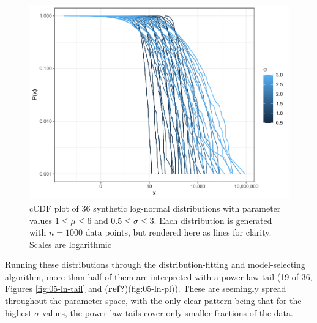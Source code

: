 \documentclass[
  12pt,
  a4paper, twoside]{book}
\begin{document}
\begin{figure}

{\centering \includegraphics[width=0.9\linewidth]{bookdown-demo_files/figure-latex/05-synth-ln-1} 

}

\caption[Log-normal distributions and parameter values]{cCDF plot of 36 synthetic log-normal distributions with parameter values \(1 \leq \mu \leq 6\) and \(0.5 \leq \sigma \leq 3\). Each distribution is generated with \(n = 1000\) data points, but rendered here as lines for clarity. Scales are logarithmic}\label{fig:05-synth-ln}
\end{figure}

Running these distributions through the distribution-fitting and model-selecting algorithm, more than half of them are interpreted with a power-law tail (19 of 36, Figures \ref{fig:05-ln-tail} and (\textbf{ref?})(fig:05-ln-pl)). These are seemingly spread throughout the parameter space, with the only clear pattern being that for the highest \(\sigma\) values, the power-law tails cover only smaller fractions of the data.
\end{document}
